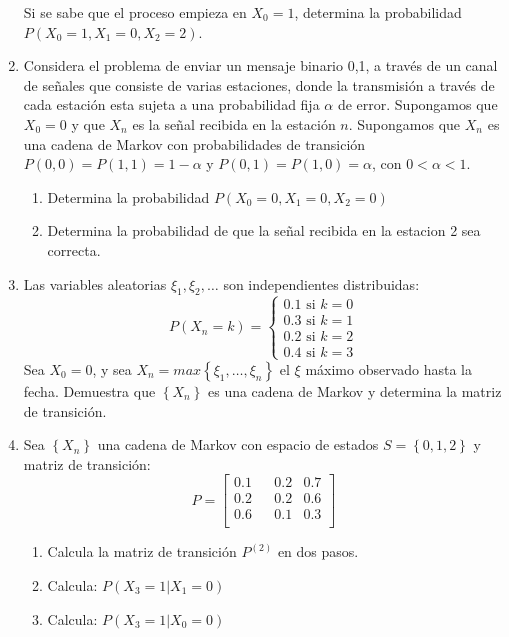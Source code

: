 \documentclass{report}
\begin{document}
\begin{enumerate}
Si se sabe que el proceso empieza en $X_0=1$, determina la probabilidad $P\left(X_0=1,X_1=0, X_2 = 2 \right)$.
\item Considera el problema de enviar un mensaje binario 0,1, a través de un canal de señales que consiste de varias estaciones, donde la transmisión a través de cada estación esta sujeta a una probabilidad fija $\alpha$ de error. Supongamos que $X_0=0$ y que $X_n$ es la señal recibida en la estación $n$.  Supongamos que $X_n$ es una cadena de Markov con probabilidades de transición $P(0,0) = P(1,1)= 1-\alpha$ y $P(0,1)=P(1,0)= \alpha$, con $0<\alpha<1$.
\begin{enumerate}
    \item Determina la probabilidad $P\left(X_0=0,X_1=0, X_2=0\right)$
    \item Determina la probabilidad de que la señal recibida en la estacion 2 sea correcta.
\end{enumerate}
\item Las variables aleatorias $\xi_1, \xi_2, \ldots$ son independientes distribuidas:
$$
P\left(X_n=k\right)=
\begin{cases}
    0.1 \text{ si } k = 0 \\
    0.3 \text{ si } k = 1 \\
    0.2 \text{ si } k = 2 \\
    0.4 \text{ si } k = 3
\end{cases}
$$
Sea $X_0=0$, y sea $X_n= max\left\{\xi_1, \ldots,\xi_n\right\}$ el $\xi$ máximo observado hasta la fecha. Demuestra que $\left\{X_n\right\}$ es una cadena de Markov y determina la matriz de transición.
\item Sea $\left\{X_n\right\}$ una cadena de Markov con espacio de estados $S = \left\{0,1,2\right\}$ y matriz de transición:
$$P= \left[
    \begin{matrix}
        0.1 & & 0.2 & 0.7 \\
        0.2 & & 0.2 & 0.6 \\
        0.6 & & 0.1 & 0.3 \\
    \end{matrix}
    \right]
$$
\begin{enumerate}
    \item Calcula la matriz de transición $P^{(2)}$ en dos pasos.
    \item Calcula: $P\left(\left. X_3 = 1\right\vert X_1=0\right)$
    \item Calcula: $P\left(\left. X_3 = 1\right\vert X_0=0\right)$
\end{enumerate}

\end{enumerate}
\end{document}
